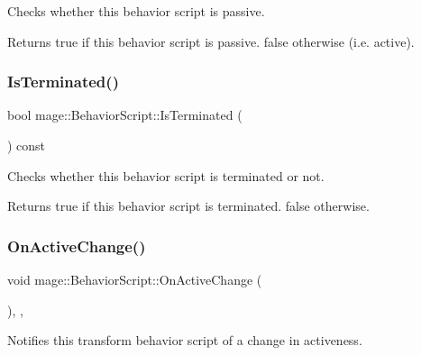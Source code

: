 Checks whether this behavior script is passive.

\begin{DoxyReturn}{Returns}
{\ttfamily true} if this behavior script is passive. {\ttfamily false} otherwise (i.\+e. active). 
\end{DoxyReturn}
\hypertarget{classmage_1_1_behavior_script_abb1625dbaa3b1145009ea474b082938f}{}\label{classmage_1_1_behavior_script_abb1625dbaa3b1145009ea474b082938f} 
\subsubsection{\texorpdfstring{Is\+Terminated()}{IsTerminated()}}
{\footnotesize\ttfamily bool mage\+::\+Behavior\+Script\+::\+Is\+Terminated (\begin{DoxyParamCaption}{ }\end{DoxyParamCaption}) const\hspace{0.3cm}{\ttfamily [noexcept]}}

Checks whether this behavior script is terminated or not.

\begin{DoxyReturn}{Returns}
{\ttfamily true} if this behavior script is terminated. {\ttfamily false} otherwise. 
\end{DoxyReturn}
\hypertarget{classmage_1_1_behavior_script_a17703fd980599ccf7265b5ffc6148fe8}{}\label{classmage_1_1_behavior_script_a17703fd980599ccf7265b5ffc6148fe8} 
\subsubsection{\texorpdfstring{On\+Active\+Change()}{OnActiveChange()}}
{\footnotesize\ttfamily void mage\+::\+Behavior\+Script\+::\+On\+Active\+Change (\begin{DoxyParamCaption}{ }\end{DoxyParamCaption})\hspace{0.3cm}{\ttfamily [private]}, {\ttfamily [virtual]}, {\ttfamily [noexcept]}}

Notifies this transform behavior script of a change in activeness. \hypertarget{classmage_1_1_behavior_script_a0b3327ebf7009e668a7022d254cb1d51}{}\label{classmage_1_1_behavior_script_a0b3327ebf7009e668a7022d254cb1d51} 
